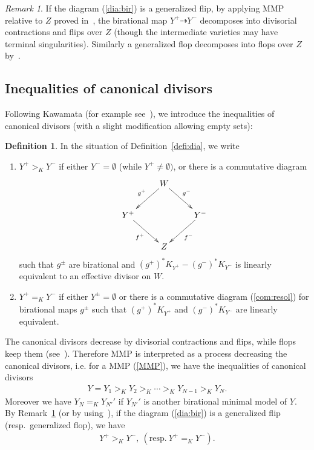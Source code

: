 \documentclass[11pt]{amsart}
\theoremstyle{plain}
\theoremstyle{definition}
\newtheorem{defi}[thm]{Definition}
\theoremstyle{remark}
\newtheorem{rmk}[thm]{Remark}
\begin{document}
\begin{rmk}\label{rmk:MMP}
If the diagram (\ref{dia:bir}) is a generalized flip, 
by applying MMP relative to $Z$ proved in~\cite{BCHM}, 
the birational map $Y^{+} \dashrightarrow Y^-$ decomposes into 
divisorial contractions and flips over $Z$
(though the intermediate varieties may have terminal 
singularities).  
Similarly a generalized flop decomposes into 
flops over $Z$ by~\cite{Kawaflo}. 
\end{rmk}

\subsection{Inequalities of canonical divisors}
Following Kawamata (for example see~\cite{KawBir}), we introduce the 
inequalities of canonical divisors (with a slight modification 
allowing empty sets): 
\begin{defi}\label{defi:ineqK}
In the situation of Definition~\ref{defi:dia}, 
we write 
\begin{enumerate}
\item 
$Y^{+}>_{K} Y^{-}$ if either 
$Y^{-}=\emptyset$ (while $Y^+ \neq \emptyset)$, 
or there is a commutative diagram
\begin{align}\label{com:resol}
\xymatrix{
& W \ar[ld]_-{g^{+}} \ar[rd]^-{g^{-}}  & \\
Y^{+}\ar[rd]_-{f^{+}} & & Y^{-} \ar[ld]^-{f^{-}} \\
& Z & 
}
\end{align}
 such that $g^{\pm}$ are birational and 
$(g^{+})^{\ast}K_{Y^{+}}-(g^{-})^{\ast}K_{Y^{-}}$ is 
linearly equivalent to an 
effective divisor
on $W$. 
\item $Y^{+}=_K Y^{-}$ if either 
$Y^{\pm}=\emptyset$ or there is a commutative 
diagram (\ref{com:resol}) 
for birational maps $g^{\pm}$ such that 
$(g^{+})^{\ast}K_{Y^{+}}$ and $(g^{-})^{\ast}K_{Y^{-}}$
are linearly equivalent. 
\end{enumerate} 
\end{defi}
The canonical divisors decrease
by divisorial contractions and flips,  
while flops keep them 
(see~\cite[Lemma~3.38]{KM}).
Therefore MMP is interpreted as a process 
decreasing 
the canonical divisors, i.e. 
for a MMP (\ref{MMP}), we have the inequalities of 
canonical divisors
\begin{align*}
Y=Y_1 >_K Y_2 >_K \cdots >_K Y_{N-1} >_K Y_N.
\end{align*}
Moreover we have $Y_{N}=_K Y_{N'}'$ if 
$Y_{N'}'$ is another birational minimal model of $Y$.  
By Remark~\ref{rmk:MMP} (or by using~\cite[Lemma~3.38]{KM}), 
if the diagram (\ref{dia:bir}) is a generalized flip 
(resp.~generalized flop), we have 
\begin{align*}
Y^{+}>_K Y^-, \ (\mbox{resp.}~Y^{+}=_K Y^-). 
\end{align*}
\end{document}
